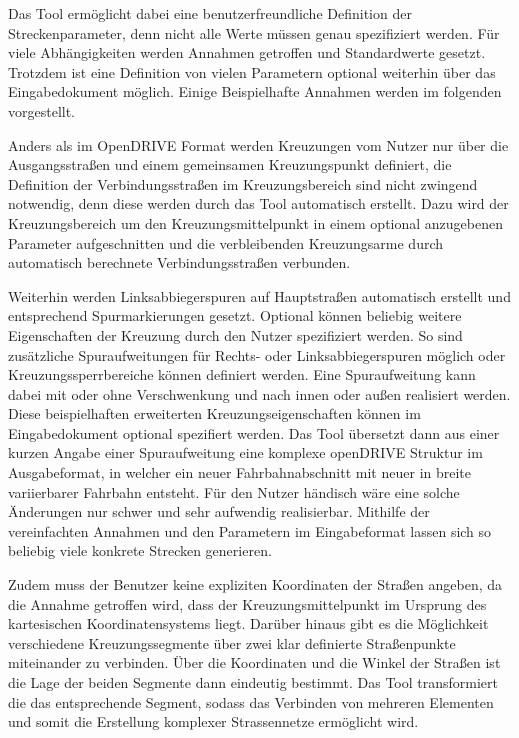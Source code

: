 Das Tool ermöglicht dabei eine benutzerfreundliche Definition der Streckenparameter, denn nicht alle Werte müssen genau spezifiziert werden. Für viele Abhängigkeiten werden Annahmen getroffen und Standardwerte gesetzt. Trotzdem ist eine Definition von vielen Parametern optional weiterhin über das Eingabedokument möglich. Einige Beispielhafte Annahmen werden im folgenden vorgestellt.

Anders als im OpenDRIVE Format werden Kreuzungen vom Nutzer nur über die Ausgangsstraßen und einem gemeinsamen Kreuzungspunkt definiert, die Definition der Verbindungsstraßen im Kreuzungsbereich sind nicht zwingend notwendig, denn diese werden durch das Tool automatisch erstellt. Dazu wird der Kreuzungsbereich um den Kreuzungsmittelpunkt in einem optional anzugebenen Parameter aufgeschnitten und die verbleibenden Kreuzungsarme durch automatisch berechnete Verbindungsstraßen verbunden.

Weiterhin werden Linksabbiegerspuren auf Hauptstraßen automatisch erstellt und entsprechend Spurmarkierungen gesetzt. Optional können beliebig weitere Eigenschaften der Kreuzung durch den Nutzer spezifiziert werden. So sind zusätzliche Spuraufweitungen für Rechts- oder Linksabbiegerspuren möglich oder Kreuzungssperrbereiche können definiert werden. Eine Spuraufweitung kann dabei mit oder ohne Verschwenkung und nach innen oder außen realisiert werden. Diese beispielhaften erweiterten Kreuzungseigenschaften können im Eingabedokument optional spezifiert werden. Das Tool übersetzt dann aus einer kurzen Angabe einer Spuraufweitung eine komplexe openDRIVE Struktur im Ausgabeformat, in welcher ein neuer Fahrbahnabschnitt mit neuer in breite variierbarer Fahrbahn entsteht. Für den Nutzer händisch wäre eine solche Änderungen nur schwer und sehr aufwendig realisierbar. Mithilfe der vereinfachten Annahmen und den Parametern im Eingabeformat lassen sich so beliebig viele konkrete Strecken generieren.

Zudem muss der Benutzer keine expliziten Koordinaten der Straßen angeben, da die Annahme getroffen wird, dass der Kreuzungsmittelpunkt im Ursprung des kartesischen Koordinatensystems liegt. Darüber hinaus gibt es die Möglichkeit verschiedene Kreuzungssegmente über zwei klar definierte Straßenpunkte miteinander zu verbinden. Über die Koordinaten und die Winkel der Straßen ist die Lage der beiden Segmente dann eindeutig bestimmt. Das Tool transformiert die das entsprechende Segment, sodass das Verbinden von mehreren Elementen und somit die Erstellung komplexer Strassennetze ermöglicht wird.

